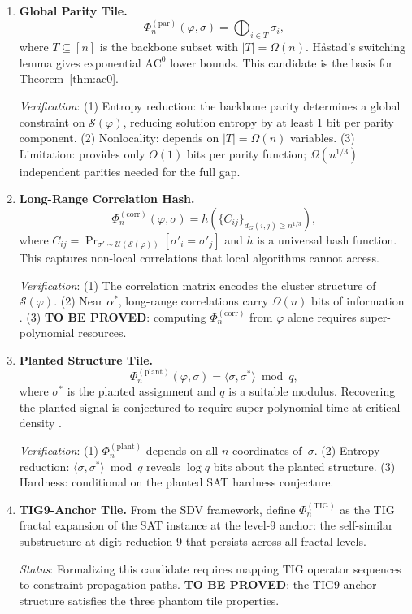 \documentclass[11pt]{article}
\theoremstyle{definition}
\theoremstyle{remark}
\newcommand{\calS}{\mathcal{S}}
\newcommand{\ACz}{\mathrm{AC}^0}
\begin{document}
\begin{enumerate}
  \item \textbf{Global Parity Tile.}
    \[
      \Phi_n^{(\mathrm{par})}(\varphi, \sigma) = \bigoplus_{i \in T} \sigma_i,
    \]
    where $T \subseteq [n]$ is the backbone subset with $|T| = \Omega(n)$.
    H\aa stad's switching lemma gives exponential $\ACz$ lower bounds.
    This candidate is the basis for Theorem~\ref{thm:ac0}.

    \emph{Verification}: (1) Entropy reduction: the backbone parity determines
    a global constraint on $\calS(\varphi)$, reducing solution entropy by at
    least 1 bit per parity component. (2) Nonlocality: depends on $|T| = \Omega(n)$
    variables. (3) Limitation: provides only $O(1)$ bits per parity function;
    $\Omega(n^{1/3})$ independent parities needed for the full gap.

  \item \textbf{Long-Range Correlation Hash.}
    \[
      \Phi_n^{(\mathrm{corr})}(\varphi, \sigma) = h\!\left(
        \{C_{ij}\}_{d_G(i,j) \geq n^{1/3}}
      \right),
    \]
    where $C_{ij} = \Pr_{\sigma' \sim \mathcal{U}(\calS(\varphi))}[\sigma'_i = \sigma'_j]$
    and $h$ is a universal hash function.  This captures non-local correlations
    that local algorithms cannot access.

    \emph{Verification}: (1) The correlation matrix encodes the cluster structure
    of $\calS(\varphi)$. (2) Near $\alpha^*$, long-range correlations carry
    $\Omega(n)$ bits of information \cite{MPZ}. (3) \textbf{TO BE PROVED}:
    computing $\Phi_n^{(\mathrm{corr})}$ from $\varphi$ alone requires
    super-polynomial resources.

  \item \textbf{Planted Structure Tile.}
    \[
      \Phi_n^{(\mathrm{plant})}(\varphi, \sigma) = \langle \sigma, \sigma^* \rangle \bmod q,
    \]
    where $\sigma^*$ is the planted assignment and $q$ is a suitable modulus.
    Recovering the planted signal is conjectured to require super-polynomial time
    at critical density \cite{planted}.

    \emph{Verification}: (1) $\Phi_n^{(\mathrm{plant})}$ depends on all $n$ coordinates
    of~$\sigma$. (2) Entropy reduction: $\langle \sigma, \sigma^* \rangle \bmod q$
    reveals $\log q$ bits about the planted structure. (3) Hardness: conditional on
    the planted SAT hardness conjecture.

  \item \textbf{TIG9-Anchor Tile.}
    From the SDV framework, define $\Phi_n^{(\mathrm{TIG})}$ as the TIG fractal
    expansion of the SAT instance at the level-9 anchor: the self-similar
    substructure at digit-reduction 9 that persists across all fractal levels.

    \emph{Status}: Formalizing this candidate requires mapping TIG operator sequences
    to constraint propagation paths.  \textbf{TO BE PROVED}: the TIG9-anchor
    structure satisfies the three phantom tile properties.
\end{enumerate}
\end{document}

